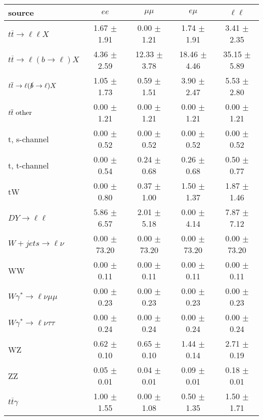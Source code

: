 \begin{tabular}{l|cccc} \hline\hline
source & $ee$ & $\mu\mu$ & $e\mu$ & $\ell\ell $ \\
\hline
$t\overline{t} \rightarrow \ell \ell X$ &  1.67 $\pm$  1.91 &  0.00 $\pm$  1.21 &  1.74 $\pm$  1.91 &  3.41 $\pm$  2.35 \\
$t\overline{t} \rightarrow \ell (b \rightarrow \ell) X$ &  4.36 $\pm$  2.59 & 12.33 $\pm$  3.78 & 18.46 $\pm$  4.46 & 35.15 $\pm$  5.89 \\
$t\overline{t} \rightarrow \ell (\slashed b \rightarrow \ell) X$ &  1.05 $\pm$  1.73 &  0.59 $\pm$  1.51 &  3.90 $\pm$  2.47 &  5.53 $\pm$  2.80 \\
        $t\overline{t}\ \rm{other}$ &  0.00 $\pm$  1.21 &  0.00 $\pm$  1.21 &  0.00 $\pm$  1.21 &  0.00 $\pm$  1.21 \\
\hline
                       t, s-channel &  0.00 $\pm$  0.52 &  0.00 $\pm$  0.52 &  0.00 $\pm$  0.52 &  0.00 $\pm$  0.52 \\
                       t, t-channel &  0.00 $\pm$  0.54 &  0.24 $\pm$  0.68 &  0.26 $\pm$  0.68 &  0.50 $\pm$  0.77 \\
                                 tW &  0.00 $\pm$  0.80 &  0.37 $\pm$  1.00 &  1.50 $\pm$  1.37 &  1.87 $\pm$  1.46 \\
\hline
         $DY \rightarrow \ell \ell$ &  5.86 $\pm$  6.57 &  2.01 $\pm$  5.18 &  0.00 $\pm$  4.14 &  7.87 $\pm$  7.12 \\
      $W+jets \rightarrow \ell \nu$ &  0.00 $\pm$ 73.20 &  0.00 $\pm$ 73.20 &  0.00 $\pm$ 73.20 &  0.00 $\pm$ 73.20 \\
                                 WW &  0.00 $\pm$  0.11 &  0.00 $\pm$  0.11 &  0.00 $\pm$  0.11 &  0.00 $\pm$  0.11 \\
\hline
$W\gamma^{*} \rightarrow \ell \nu \mu\mu$ &  0.00 $\pm$  0.23 &  0.00 $\pm$  0.23 &  0.00 $\pm$  0.23 &  0.00 $\pm$  0.23 \\
$W\gamma^{*} \rightarrow \ell \nu \tau\tau$ &  0.00 $\pm$  0.24 &  0.00 $\pm$  0.24 &  0.00 $\pm$  0.24 &  0.00 $\pm$  0.24 \\
                                 WZ &  0.62 $\pm$  0.10 &  0.65 $\pm$  0.10 &  1.44 $\pm$  0.14 &  2.71 $\pm$  0.19 \\
                                 ZZ &  0.05 $\pm$  0.01 &  0.04 $\pm$  0.01 &  0.09 $\pm$  0.01 &  0.18 $\pm$  0.01 \\
\hline
              $t\overline{t}\gamma$ &  1.00 $\pm$  1.55 &  0.00 $\pm$  1.08 &  0.50 $\pm$  1.35 &  1.50 $\pm$  1.71 \\

\end{tabular}
